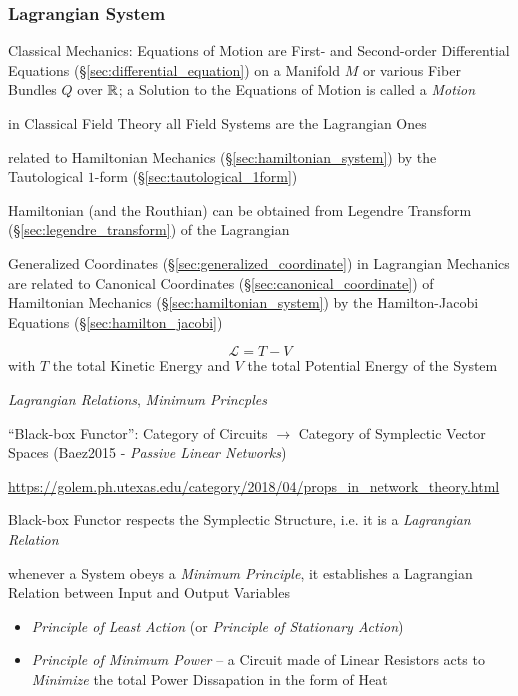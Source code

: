 \subsubsection{Lagrangian System}\label{sec:lagrangian_system}

Classical Mechanics: Equations of Motion are First- and Second-order
Differential Equations (\S\ref{sec:differential_equation}) on a Manifold $M$ or
various Fiber Bundles $Q$ over $\mathbb{R}$; a Solution to the Equations of Motion
is called a \emph{Motion}

in Classical Field Theory all Field Systems are the Lagrangian Ones

related to Hamiltonian Mechanics (\S\ref{sec:hamiltonian_system}) by the
Tautological $1$-form (\S\ref{sec:tautological_1form})

Hamiltonian (and the Routhian) can be obtained from Legendre Transform
(\S\ref{sec:legendre_transform}) of the Lagrangian

Generalized Coordinates (\S\ref{sec:generalized_coordinate}) in Lagrangian
Mechanics are related to Canonical Coordinates
(\S\ref{sec:canonical_coordinate}) of Hamiltonian Mechanics
(\S\ref{sec:hamiltonian_system}) by the Hamilton-Jacobi Equations
(\S\ref{sec:hamilton_jacobi})

\[
  \mathcal{L} = T - V
\]
with $T$ the total Kinetic Energy and $V$ the total Potential Energy of the
System

\emph{Lagrangian Relations}, \emph{Minimum Princples}

``Black-box Functor'': Category of Circuits $\rightarrow$ Category of
Symplectic Vector Spaces (Baez2015 - \emph{Passive Linear Networks})

\url{https://golem.ph.utexas.edu/category/2018/04/props_in_network_theory.html}

Black-box Functor respects the Symplectic Structure, i.e. it is a
\emph{Lagrangian Relation}

whenever a System obeys a \emph{Minimum Principle}, it establishes a Lagrangian
Relation between Input and Output Variables

\begin{itemize}
  \item \emph{Principle of Least Action} (or \emph{Principle of Stationary
    Action})
  \item \emph{Principle of Minimum Power} -- a Circuit made of Linear Resistors
    acts to \emph{Minimize} the total Power Dissapation in the form of Heat
\end{itemize}

